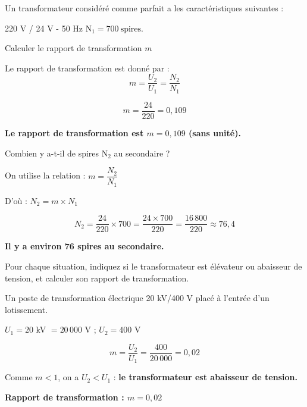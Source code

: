 \documentclass[11pt,a4paper]{article}
\begin{document}
 Un transformateur considéré comme parfait a les caractéristiques suivantes : \\\begin{center}
220 V / 24 V - 50 Hz $\mathrm{N_1=700~spires}$.
\end{center}

\vfill 

 Calculer le rapport de transformation $m$ 

\begin{tcolorbox}[colback=red!5!white,colframe=red!75!black]
{
Le rapport de transformation est donné par : 
$$m = \dfrac{U_2}{U_1} = \dfrac{N_2}{N_1}$$

$$m = \dfrac{24}{220} = 0{,}109$$

\textbf{Le rapport de transformation est $m = 0{,}109$ (sans unité).}
}
\end{tcolorbox}

\vfill 

 Combien y a-t-il de spires $\mathrm{N_2}$ au secondaire ? 

\begin{tcolorbox}[colback=red!5!white,colframe=red!75!black]
On utilise la relation : $m = \dfrac{N_2}{N_1}$

D'où : $N_2 = m \times N_1$

$$N_2 = \dfrac{24}{220} \times 700 = \dfrac{24 \times 700}{220} = \dfrac{16\,800}{220} \approx 76{,}4$$

\textbf{Il y a environ 76 spires au secondaire.}
\end{tcolorbox}

\vfill 

\begin{center}
Pour chaque situation, indiquez si le transformateur est élévateur ou abaisseur de tension, et calculer son rapport de transformation. 
\end{center}

\vfill 

 Un poste de transformation électrique 20 kV/400 V placé à l'entrée d'un lotissement. 

\begin{tcolorbox}[colback=red!5!white,colframe=red!75!black]
{\color{blue}
$U_1 = 20$ kV $= 20\,000$ V \quad ; \quad $U_2 = 400$ V

$$m = \dfrac{U_2}{U_1} = \dfrac{400}{20\,000} = 0{,}02$$

Comme $m < 1$, on a $U_2 < U_1$ : \textbf{le transformateur est abaisseur de tension.}

\textbf{Rapport de transformation : $m = 0{,}02$}
}
\end{tcolorbox}
\end{document}
